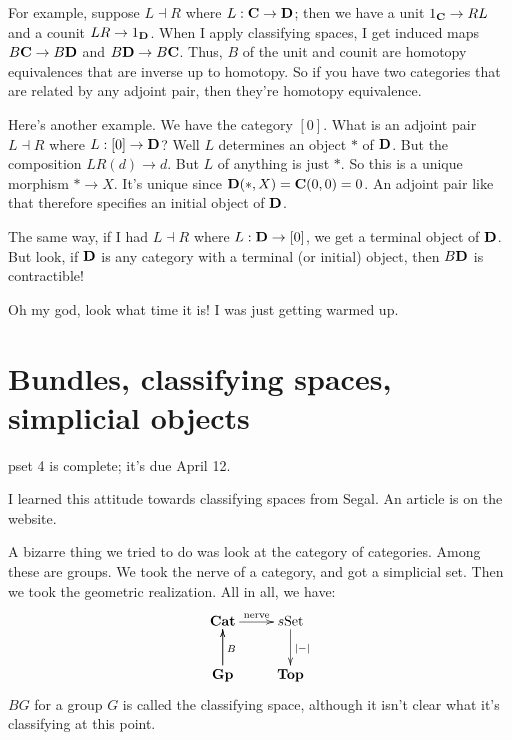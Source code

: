 For example, suppose $L\dashv R$ where $L:\mathbf C\to \mathbf D$; then we have a unit $1_\mathbf C\to RL$ and a counit $LR\to 1_\mathbf D$.
When I apply classifying spaces, I get induced maps $B\mathbf C\to B\mathbf D$ and $B\mathbf D\to B\mathbf C$.
Thus, $B$ of the unit and counit are homotopy equivalences that are inverse up to homotopy.
So if you have two categories that are related by any adjoint pair, then they're homotopy equivalence.

Here's another example. We have the category $[0]$. What is an adjoint pair $L\dashv R$ where $L:[0]\to \mathbf D$? Well $L$ determines an object $\ast$ of $\mathbf D$. But the composition $LR(d)\to d$.
But $L$ of anything is just $\ast$. So this is a unique morphism $\ast\to X$.
It's unique since $\mathbf D(\ast,X) = \mathbf C(0,0) = 0$.
An adjoint pair like that therefore specifies an initial object of $\mathbf D$.

The same way, if I had $L\dashv R$ where $L:\mathbf D\to [0]$, we get a terminal object of $\mathbf D$.
But look, if $\mathbf D$ is any category with a terminal (or initial) object, then $B\mathbf D$ is contractible!

Oh my god, look what time it is! I was just getting warmed up.
\section{Bundles, classifying spaces, simplicial objects}
pset 4 is complete; it's due April 12.

I learned this attitude towards classifying spaces from Segal.
An article is on the website.

A bizarre thing we tried to do was look at the category of categories.
Among these are groups.
We took the nerve of a category, and got a simplicial set.
Then we took the geometric realization.
All in all, we have:
\begin{equation*}
    \xymatrix{
	\Cat\ar[r]^{\text{nerve}} & s\Set\ar[d]^{|-|}\\
	\mathbf{Gp}\ar[u]\ar[u]_{B} & \Top
    }
\end{equation*}
$BG$ for a group $G$ is called the classifying space, although it isn't clear what it's classifying at this point.

